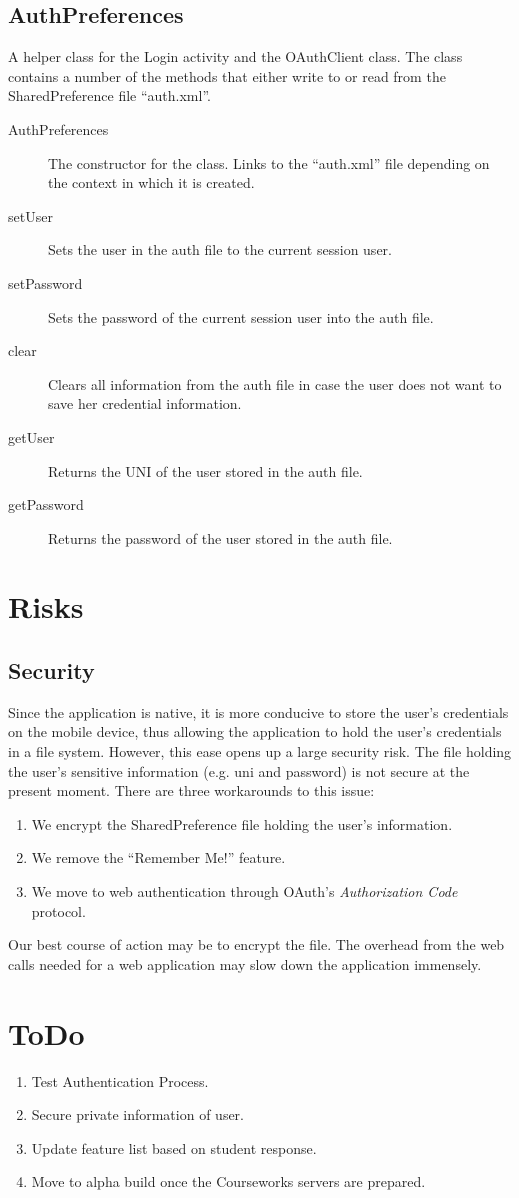 \documentclass{article}
\begin{document}
\subsection{AuthPreferences}
A helper class for the Login activity and the OAuthClient class. The class contains a number of the methods that either write to or read from the SharedPreference file ``auth.xml''.
 \begin{description}
  \item[AuthPreferences] The constructor for the class. Links to the ``auth.xml'' file depending on the context in which it is created.
  \item[setUser] Sets the user in the auth file to the current session user.
  \item[setPassword] Sets the password of the current session user into the auth file.
  \item[clear] Clears all information from the auth file in case the user does not want to save her credential information.
  \item[getUser] Returns the UNI of the user stored in the auth file.
  \item[getPassword] Returns the password of the user stored in the auth file.
 \end{description}

\section{Risks}
 \subsection{Security}
Since the application is native, it is more conducive to store the user's credentials on the mobile device, thus allowing the application to hold the user's credentials in a file system. However, this ease opens up a large security risk. The file holding the user's sensitive information (e.g. uni and password) is not secure at the present moment. There are three workarounds to this issue:
  \begin{enumerate}
   \item We encrypt the SharedPreference file holding the user's information.
   \item We remove the ``Remember Me!'' feature.
   \item We move to web authentication through OAuth's \emph{Authorization Code} protocol.
  \end{enumerate}
Our best course of action may be to encrypt the file. The overhead from the web calls needed for a web application may slow down the application immensely.

\section{ToDo}
 \begin{enumerate}
  \item Test Authentication Process.
  \item Secure private information of user.
  \item Update feature list based on student response.
  \item Move to alpha build once the Courseworks servers are prepared.
 \end{enumerate}
\end{document}
